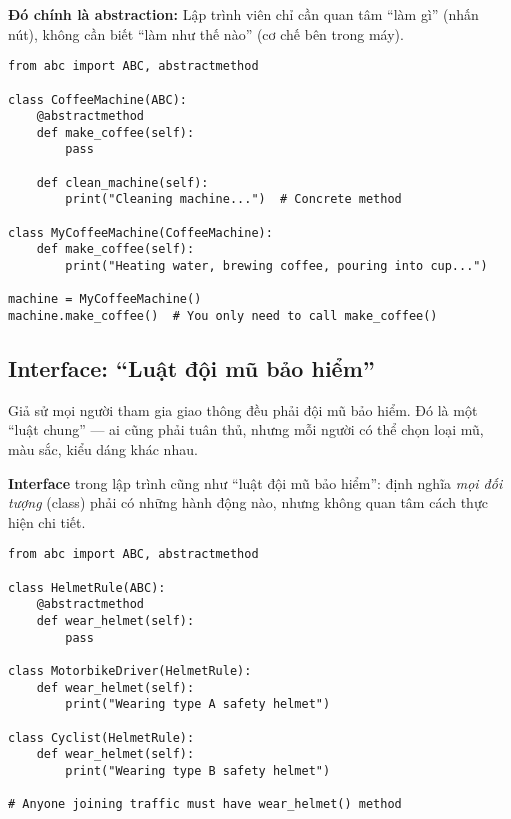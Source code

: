 \textbf{Đó chính là abstraction:} Lập trình viên chỉ cần quan tâm ``làm gì'' (nhấn nút), không cần biết ``làm như thế nào'' (cơ chế bên trong máy).

\begin{lstlisting}[caption={Ví dụ về Abstraction}]
from abc import ABC, abstractmethod

class CoffeeMachine(ABC):
    @abstractmethod
    def make_coffee(self):
        pass

    def clean_machine(self):
        print("Cleaning machine...")  # Concrete method

class MyCoffeeMachine(CoffeeMachine):
    def make_coffee(self):
        print("Heating water, brewing coffee, pouring into cup...")

machine = MyCoffeeMachine()
machine.make_coffee()  # You only need to call make_coffee()
\end{lstlisting}

\subsection{Interface: ``Luật đội mũ bảo hiểm''}
Giả sử mọi người tham gia giao thông đều phải đội mũ bảo hiểm. Đó là một ``luật chung'' --- ai cũng phải tuân thủ, nhưng mỗi người có thể chọn loại mũ, màu sắc, kiểu dáng khác nhau.

\textbf{Interface} trong lập trình cũng như ``luật đội mũ bảo hiểm'': định nghĩa \emph{mọi đối tượng} (class) phải có những hành động nào, nhưng không quan tâm cách thực hiện chi tiết.

\begin{lstlisting}[caption={Ví dụ về Interface}]
from abc import ABC, abstractmethod

class HelmetRule(ABC):
    @abstractmethod
    def wear_helmet(self):
        pass

class MotorbikeDriver(HelmetRule):
    def wear_helmet(self):
        print("Wearing type A safety helmet")

class Cyclist(HelmetRule):
    def wear_helmet(self):
        print("Wearing type B safety helmet")

# Anyone joining traffic must have wear_helmet() method
\end{lstlisting}


